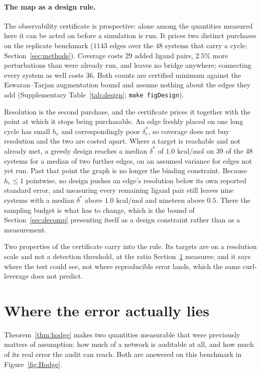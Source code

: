 \paragraph{The map as a design rule.} The observability certificate is prospective: alone among the
quantities measured here it can be acted on before a simulation is run. It prices two distinct
purchases on the replicate benchmark ($1143$ edges over the $48$ systems that carry a cycle;
Section~\ref{sec:methods}). Coverage costs $29$ added ligand pairs, $2.5\%$ more perturbations than
were already run, and leaves no bridge anywhere; connecting every system as well costs $36$. Both
counts are certified minimum against the Eswaran--Tarjan augmentation bound and assume nothing
about the edges they add (Supplementary Table~\ref{tab:design}; \texttt{make figDesign}).

Resolution is the second purchase, and the certificate prices it together with the point at which
it stops being purchasable. An edge freshly placed on one long cycle has small $h_e$ and
correspondingly poor $\delta^\ast_e$, so coverage does not buy resolution and the two are costed
apart. Where a target is reachable and not already met, a greedy design reaches a median
$\delta^\ast$ of $1.0$ kcal/mol on $39$ of the $48$ systems for a median of two further edges, on
an assumed variance for edges not yet run. Past that point the graph is no longer the binding
constraint. Because $h_e\leq1$ pointwise, no design pushes an edge's resolution below its own
reported standard error, and measuring every remaining ligand pair still leaves nine systems with a
median $\delta^\ast$ above $1.0$ kcal/mol and nineteen above $0.5$. There the sampling budget is
what has to change, which is the bound of Section~\ref{sec:decomp} presenting itself as a design
constraint rather than as a measurement.

Two properties of the certificate carry into the rule. Its targets are on a resolution scale and
not a detection threshold, at the ratio Section~\ref{sec:hodge} measures; and it says where the
test could see, not where reproducible error lands, which the same curl-leverage does not predict.

\section{Where the error actually lies}\label{sec:hodge}
Theorem~\ref{thm:hodge} makes two quantities measurable that were previously matters of
assumption: how much of a network is auditable at all, and how much of its real error the audit
can reach. Both are answered on this benchmark in Figure~\ref{fig:Hodge}.


